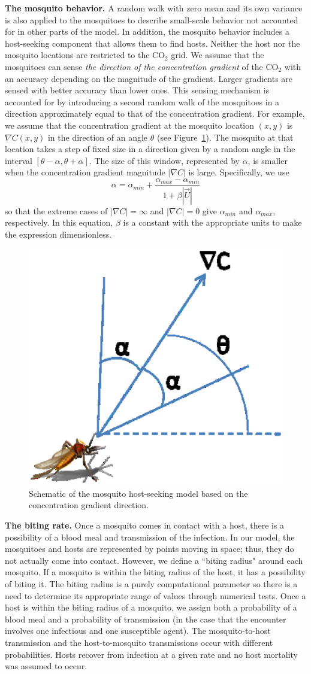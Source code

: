 \documentclass[11pt]{article}
\begin{document}
{\bf The mosquito behavior.} A random walk with zero mean and its own variance is also applied to the mosquitoes to describe small-scale behavior not accounted for in other parts of the model.  In addition, the mosquito behavior includes a host-seeking component that allows them to find hosts. Neither the host nor the mosquito
locations are restricted to the CO$_2$ grid. We assume that the mosquitoes can sense {\em the direction
of the concentration gradient} of the CO$_2$ with an accuracy depending on the magnitude of the gradient.
Larger gradients are sensed with better accuracy than lower ones.
This sensing mechanism is accounted for by introducing a second random walk of the mosquitoes
in a direction approximately equal to that of the concentration gradient.
%
For example, we assume that the concentration gradient at the
mosquito location $(x,y)$ is $\nabla C(x,y)$ in the direction of an angle $\theta$
(see Figure~\ref{MosquitoGradient}).
The mosquito at that location takes a step of fixed size in a direction given
by a random angle in the interval $[\theta-\alpha, \theta+\alpha]$.  The size of this window,
represented by $\alpha$, is smaller when the concentration gradient magnitude $|\nabla C|$ is large.
Specifically, we use
\[
\alpha = \alpha_{min} + \frac{ \alpha_{max}-\alpha_{min}}{1 + \beta|\vec{U}|}
\]
so that the extreme cases of $|\nabla C|=\infty$ and $|\nabla C|=0$ give
$\alpha_{min}$ and $\alpha_{max}$, respectively. In this equation, $\beta$ is a constant with
the appropriate units to make the expression dimensionless.

\begin{figure}[hbtp]
\centering
 \includegraphics[width=.2\textwidth]{figures/GradientWalkSchematic.ps}
\caption{Schematic of the mosquito host-seeking model based on the concentration gradient direction.}
\label{MosquitoGradient}
\end{figure}


{\bf The biting rate.} Once a mosquito comes in contact with a host, there is a possibility of
a blood meal and transmission of the infection.  In our model, the
mosquitoes and hosts are represented by points moving in space; thus,  they do not actually come into
contact. However, we define a ``biting radius" around each mosquito.  If a mosquito is within the biting radius of the host, it has a possibility of biting it.  The biting radius is a purely computational parameter so
there is a need to determine its appropriate range of values through
numerical tests.  Once a host is within the biting radius of a mosquito, we
assign both a probability of a blood meal and a probability of transmission (in the case that
the encounter involves one infectious and one susceptible agent).
The mosquito-to-host transmission and the host-to-mosquito transmissions
occur with different probabilities.  Hosts recover from infection at a given rate and
no host mortality was assumed to occur.
\end{document}
